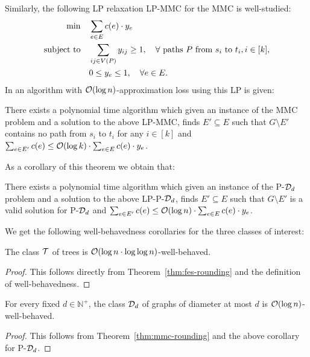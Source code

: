     Similarly, the following \textsc{LP} relaxation \textsc{LP-MMC} for the \textsc{MMC} is well-studied:
    \begin{align}
        \min \quad &\sum_{e\in E} c\mathopen{}\left( e \right) \cdot y_{e}\\
        \text{subject to} \quad &\sum_{ij\in V\mathopen{}\left( P \right)} y_{ij} \geq 1, \quad \forall \text{ paths } P \text{ from } s_i \text{ to } t_i, i\in [k],\\
        &0\leq y_{e} \leq 1, \quad \forall e\in E.
    \end{align}
    In \cite{ApproximateMaxFlowMinMultiCut1993} an algorithm with $\mathcal{O}\mathopen{}\left( \log n \right)$-approximation loss using this LP is given:
    \begin{theorem}\label{thm:mmc-rounding}
        There exists a polynomial time algorithm which given an instance of the \textsc{MMC} problem and a solution to the above \textsc{LP-MMC}, finds $E'\subseteq E$ such that $G\setminus E'$ contains no path from $s_i$ to $t_i$ for any $i\in [k]$ and $\sum_{e\in E'} c\mathopen{}\left( e \right) \leq \mathcal{O}\mathopen{}\left( \log k \right)\cdot \sum_{e\in E} c\mathopen{}\left( e \right) \cdot y_{e}$.
    \end{theorem}
    As a corollary of this theorem we obtain that:
    \begin{corollary}
        There exists a polynomial time algorithm which given an instance of the \textsc{P-$\mathcal{D}_d$} problem and a solution to the above \textsc{LP-P-$\mathcal{D}_d$}, finds $E'\subseteq E$ such that $G\setminus E'$ is a valid solution for \textsc{P-$\mathcal{D}_d$} and $\sum_{e\in E'} c\mathopen{}\left( e \right) \leq \mathcal{O}\mathopen{}\left( \log n \right)\cdot \sum_{e\in E} c\mathopen{}\left( e \right) \cdot y_{e}$.
    \end{corollary}

    We get the following well-behavedness corollaries for the three classes of interest:
    \begin{corollary}\label{cor:tree-well-behaved}
        The class $\mathcal{T}$ of trees is $\mathcal{O}\mathopen{}\left( \log n\cdot\log\log n \right)$-well-behaved.
    \end{corollary}
    \begin{proof}
        This follows directly from Theorem~\ref{thm:fes-rounding} and the definition of well-behavedness.
    \end{proof}

    \begin{corollary}\label{cor:diameter-well-behaved}
        For every fixed $d\in\mathbb{N}^+$, the class $\mathcal{D}_d$ of graphs of diameter at most $d$ is $\mathcal{O}\mathopen{}\left( \log n \right)$-well-behaved.
    \end{corollary}
    \begin{proof}
        This follows from Theorem~\ref{thm:mmc-rounding} and the above corollary for \textsc{P-$\mathcal{D}_d$}.
    \end{proof}

